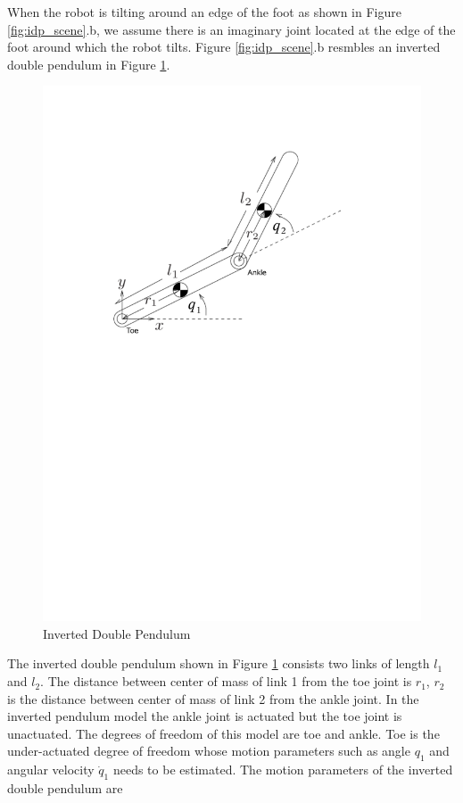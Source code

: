 When the robot is tilting around an edge of the foot as shown in Figure \ref{fig:idp_scene}.b, we assume there is an imaginary joint located at the edge of the foot around which the robot tilts. Figure \ref{fig:idp_scene}.b resmbles an inverted double pendulum in Figure \ref{fig:idp}.
\begin{figure}[H]
	\centering
	\includegraphics[trim= 0mm 150mm 0mm 0mm, scale=0.65]{Bilder/inv_db_pend.pdf}
	\caption[Inverted Double Pendulum]{Inverted Double Pendulum \footnotemark}
	\label{fig:idp}
\end{figure}
 The inverted double pendulum shown in Figure \ref{fig:idp} consists two links of length $l_1$ and $l_2$. The distance between center of mass of link 1 from the toe joint is $r_1$, $r_2$ is the distance between center of mass of link 2 from the ankle joint. In the inverted pendulum model the ankle joint is actuated but the toe joint is unactuated. The degrees of freedom of this model are toe and ankle. Toe is the under-actuated degree of freedom whose motion parameters such as angle $q_1$ and angular velocity $\dot{q}_1$ needs to be estimated. The motion parameters of the inverted double pendulum are 
